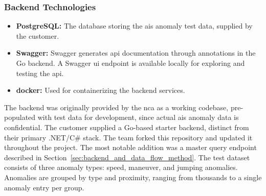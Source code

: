 \subsubsection{Backend Technologies}
\begin{itemize}
\item \textbf{PostgreSQL:} The database storing the \acrshort{ais} anomaly test data, supplied by the customer.
\item \textbf{Swagger:} Swagger generates \acrshort{api} documentation through annotations in the Go backend. A Swagger \acrshort{ui} endpoint is available locally for exploring and testing the \acrshort{api}.
\item \textbf{\gls{docker}:} Used for containerizing the backend services.
\end{itemize}

The backend was originally provided by the \acrshort{nca} as a working codebase, pre-populated with test data for development, since actual \acrshort{ais} anomaly data is confidential. The customer supplied a Go-based starter backend, distinct from their primary .NET/C\# stack. The team forked this repository and updated it throughout the project. The most notable addition was a master query endpoint described in Section~\ref{sec:backend_and_data_flow_method}. The test dataset consists of three anomaly types: speed, maneuver, and jumping anomalies. Anomalies are grouped by type and proximity, ranging from thousands to a single anomaly entry per group. 



